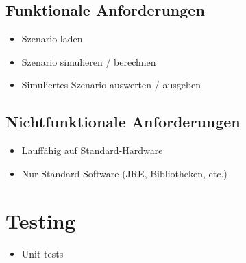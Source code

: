 \documentclass[11pt,a4paper]{article}
\begin{document}
\subsection{Funktionale Anforderungen}
\begin{itemize}
  \item Szenario laden
  \item Szenario simulieren / berechnen
  \item Simuliertes Szenario auswerten / ausgeben
\end{itemize}
%
\subsection{Nichtfunktionale Anforderungen}
\begin{itemize}
  \item Lauffähig auf Standard-Hardware
  \item Nur Standard-Software (JRE, Bibliotheken, etc.)
\end{itemize}
%
%
\section{Testing}
\begin{itemize}
  \item Unit tests
\end{itemize}
%
\end{document}
